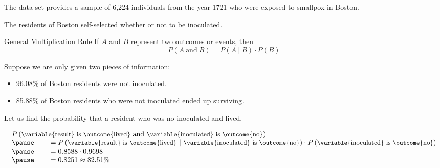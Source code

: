 \documentclass{beamer}
\newcommand{\prob}[1]{P\left({#1}\right)}
\newcommand{\jointprob}[3]{\prob{{#1}~\text{#2}~{#3}}}
\newcommand{\condprob}[2]{\prob{{#1}~|~{#2}}}
\begin{document}
\begin{frame}
\begin{example}
The  data set provides a sample of 6,224 individuals from the year 1721 who were exposed to smallpox in Boston.

\vspace{2mm}
The residents of Boston self-selected whether or not to be inoculated.

\vspace{2mm}
\pause
{}\pause

\vspace{2mm}
\pause
{}\pause

\vspace{2mm}
\pause
{}
\end{example}
\end{frame}

\begin{frame}
\begin{block}{General Multiplication Rule}
If $A$ and $B$ represent two outcomes or events, then
\begin{equation*}
\jointprob{A}{and}{B} = \condprob{A}{B}\cdot\prob{B}
\end{equation*}
\end{block}\pause

\begin{example}
Suppose we are only given two pieces of information: 
\begin{itemize}
\item 96.08\% of Boston residents were not inoculated.
\item 85.88\% of Boston residents who were not inoculated ended up surviving.
\end{itemize}
Let us find the probability that a resident who was no inoculated  and lived.\pause

\vspace{-5mm}
\begin{equation*}
\begin{array}{l}
\jointprob{\text{\small\variable{result} is \outcome{lived}}}{and}{\text{\small\variable{inoculated} is \outcome{no}}} \\\pause
\qquad= \condprob{\text{\small\variable{result} is \outcome{lived}}}{\text{\small\variable{inoculated} is \outcome{no}}} \cdot \prob{\text{\small\variable{inoculated} is \outcome{no}}}\\\pause
\qquad= 0.8588 \cdot 0.9698\\\pause
\qquad= 0.8251 \approx 82.51\%
\end{array}
\end{equation*}
\end{example}
\end{frame}
\end{document}
